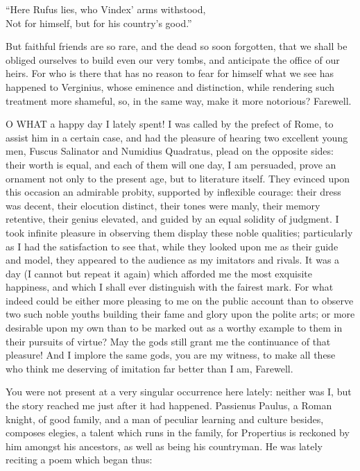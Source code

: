``Here Rufus lies, who Vindex' arms withstood,\\
Not for himself, but for his country's good.''

But faithful friends are so rare, and the dead so soon forgotten, that we
shall be obliged ourselves to build even our very tombs, and anticipate
the office of our heirs. For who is there that has no reason to fear for
himself what we see has happened to Verginius, whose eminence and
distinction, while rendering such treatment more shameful, so, in the same
way, make it more notorious? Farewell.


O WHAT a happy day I lately spent! I was called by the prefect of Rome, to
assist him in a certain case, and had the pleasure of hearing two
excellent young men, Fuscus Salinator and Numidius Quadratus, plead on the
opposite sides: their worth is equal, and each of them will one day, I am
persuaded, prove an ornament not only to the present age, but to
literature itself. They evinced upon this occasion an admirable probity,
supported by inflexible courage: their dress was decent, their elocution
distinct, their tones were manly, their memory retentive, their genius
elevated, and guided by an equal solidity of judgment. I took infinite
pleasure in observing them display these noble qualities; particularly as
I had the satisfaction to see that, while they looked upon me as their
guide and model, they appeared to the audience as my imitators and rivals.
It was a day (I cannot but repeat it again) which afforded me the most
exquisite happiness, and which I shall ever distinguish with the fairest
mark. For what indeed could be either more pleasing to me on the public
account than to observe two such noble youths building their fame and
glory upon the polite arts; or more desirable upon my own than to be
marked out as a worthy example to them in their pursuits of virtue? May
the gods still grant me the continuance of that pleasure! And I implore
the same gods, you are my witness, to make all these who think me
deserving of imitation far better than I am, Farewell.


You were not present at a very singular occurrence here lately: neither
was I, but the story reached me just after it had happened. Passienus
Paulus, a Roman knight, of good family, and a man of peculiar learning and
culture besides, composes elegies, a talent which runs in the family, for
Propertius is reckoned by him amongst his ancestors, as well as being his
countryman. He was lately reciting a poem which began thus:

